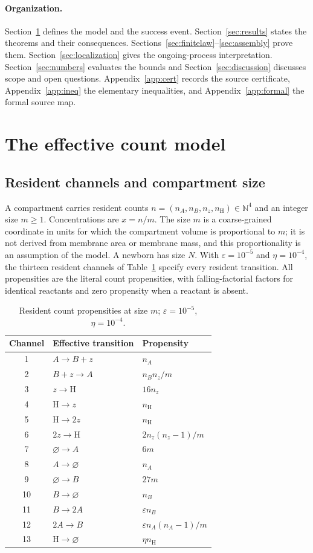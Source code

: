 \documentclass[11pt,a4paper]{article}
\theoremstyle{plain}
\theoremstyle{definition}
\theoremstyle{remark}
\newcommand{\N}{\mathbb N}
\newcommand{\eps}{\varepsilon}
\newcommand{\Hs}{\mathrm H}
\begin{document}
\paragraph{Organization.}
Section~\ref{sec:model} defines the model and the success event. Section~\ref{sec:results} states the theorems and their consequences. Sections~\ref{sec:finitelaw}--\ref{sec:assembly} prove them. Section~\ref{sec:localization} gives the ongoing-process interpretation. Section~\ref{sec:numbers} evaluates the bounds and Section~\ref{sec:discussion} discusses scope and open questions. Appendix~\ref{app:cert} records the source certificate, Appendix~\ref{app:ineq} the elementary inequalities, and Appendix~\ref{app:formal} the formal source map.

\section{The effective count model}\label{sec:model}

\subsection{Resident channels and compartment size}
A compartment carries resident counts $n=(n_A,n_B,n_z,n_\Hs)\in\N^4$ and an integer size $m\geq1$. Concentrations are $x=n/m$. The size $m$ is a coarse-grained coordinate in units for which the compartment volume is proportional to $m$; it is not derived from membrane area or membrane mass, and this proportionality is an assumption of the model. A newborn has size $N$. With $\eps=10^{-5}$ and $\eta=10^{-4}$, the thirteen resident channels of Table~\ref{tab:rates} specify every resident transition. All propensities are the literal count propensities, with falling-factorial factors for identical reactants and zero propensity when a reactant is absent.

\begin{table}[ht]
\centering
\caption{Resident count propensities at size $m$; $\eps=10^{-5}$, $\eta=10^{-4}$.}
\label{tab:rates}
\begin{tabular}{cll}
\toprule
Channel & Effective transition & Propensity\\
\midrule
1 & $A\to B+z$ & $n_A$\\
2 & $B+z\to A$ & $n_Bn_z/m$\\
3 & $z\to\Hs$ & $16n_z$\\
4 & $\Hs\to z$ & $n_\Hs$\\
5 & $\Hs\to2z$ & $n_\Hs$\\
6 & $2z\to\Hs$ & $2n_z(n_z-1)/m$\\
7 & $\varnothing\to A$ & $6m$\\
8 & $A\to\varnothing$ & $n_A$\\
9 & $\varnothing\to B$ & $27m$\\
10 & $B\to\varnothing$ & $n_B$\\
11 & $B\to2A$ & $\eps n_B$\\
12 & $2A\to B$ & $\eps n_A(n_A-1)/m$\\
13 & $\Hs\to\varnothing$ & $\eta n_\Hs$\\
\bottomrule
\end{tabular}
\end{table}
\end{document}
